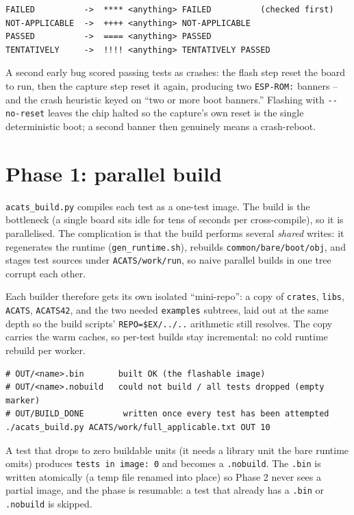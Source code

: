 \begin{lstlisting}[style=sh]
FAILED          ->  **** <anything> FAILED          (checked first)
NOT-APPLICABLE  ->  ++++ <anything> NOT-APPLICABLE
PASSED          ->  ==== <anything> PASSED
TENTATIVELY     ->  !!!! <anything> TENTATIVELY PASSED
\end{lstlisting}

A second early bug scored passing tests as crashes: the flash step reset the board to
run, then the capture step reset it again, producing two \texttt{ESP-ROM:} banners --
and the crash heuristic keyed on ``two or more boot banners.'' Flashing with
\texttt{-{}-no-reset} leaves the chip halted so the capture's own reset is the single
deterministic boot; a second banner then genuinely means a crash-reboot.

\section{Phase 1: parallel build}

\texttt{acats\_build.py} compiles each test as a one-test image. The build is the
bottleneck (a single board sits idle for tens of seconds per cross-compile), so it is
parallelised. The complication is that the build performs several \emph{shared} writes:
it regenerates the runtime (\texttt{gen\_runtime.sh}), rebuilds
\texttt{common/bare/boot/obj}, and stages test sources under \texttt{ACATS/work/run},
so naive parallel builds in one tree corrupt each other.

Each builder therefore gets its own isolated ``mini-repo'': a copy of
\texttt{crates}, \texttt{libs}, \texttt{ACATS}, \texttt{ACATS42}, and the two needed
\texttt{examples} subtrees, laid out at the same depth so the build scripts'
\texttt{REPO=\$EX/../..} arithmetic still resolves. The copy carries the warm caches,
so per-test builds stay incremental: no cold runtime rebuild per worker.

\begin{lstlisting}[style=sh]
# OUT/<name>.bin       built OK (the flashable image)
# OUT/<name>.nobuild   could not build / all tests dropped (empty marker)
# OUT/BUILD_DONE        written once every test has been attempted
./acats_build.py ACATS/work/full_applicable.txt OUT 10
\end{lstlisting}

A test that drops to zero buildable units (it needs a library unit the bare runtime
omits) produces \texttt{tests in image: 0} and becomes a \texttt{.nobuild}. The
\texttt{.bin} is written atomically (a temp file renamed into place) so Phase 2 never
sees a partial image, and the phase is resumable: a test that already has a
\texttt{.bin} or \texttt{.nobuild} is skipped.

